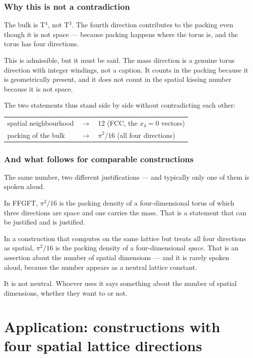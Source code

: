 \subsection*{Why this is not a contradiction}

The bulk is T$^4$, not T$^3$. The fourth direction contributes to the
packing even though it is not space --- because packing happens where
the torus is, and the torus has four directions.

This is admissible, but it must be said. The mass direction is a
genuine torus direction with integer windings, not a caption. It counts
in the packing because it is geometrically present, and it does not
count in the spatial kissing number because it is not space.

The two statements thus stand side by side without contradicting each
other:
\begin{center}
\begin{tabular}{lcl}
spatial neighbourhood & $\longrightarrow$ & 12 (FCC, the $x_4 = 0$ vectors) \\
packing of the bulk & $\longrightarrow$ & $\pi^2/16$ (all four directions) \\
\end{tabular}
\end{center}

\subsection*{And what follows for comparable constructions}

The same number, two different justifications --- and typically only
one of them is spoken aloud.

In FFGFT, $\pi^2/16$ is the packing density of a four-dimensional torus
of which three directions are space and one carries the mass. That is a
statement that can be justified and is justified.

In a construction that computes on the same lattice but treats all four
directions as spatial, $\pi^2/16$ is the packing density of a
four-dimensional \emph{space}. That is an assertion about the number of
spatial dimensions --- and it is rarely spoken aloud, because the
number appears as a neutral lattice constant.

It is not neutral. Whoever uses it says something about the number of
spatial dimensions, whether they want to or not.

\chapter{Application: constructions with four spatial lattice
directions}

